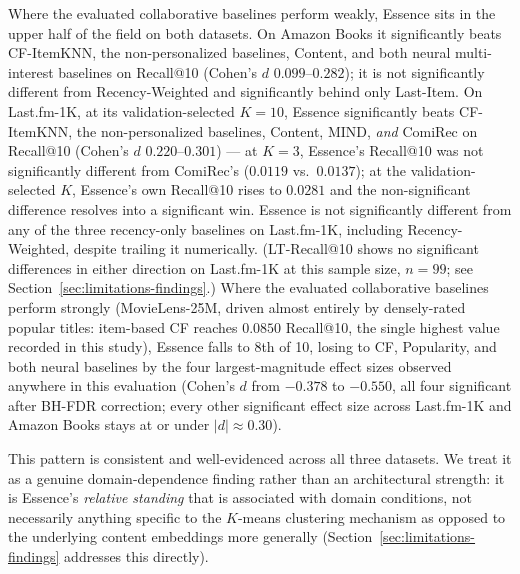 \documentclass[11pt,a4paper]{article}
\begin{document}
Where the evaluated collaborative baselines perform weakly, Essence
sits in the upper half of the field on both datasets. On Amazon Books it
significantly beats CF-ItemKNN, the non-personalized baselines, Content,
and both neural multi-interest baselines on Recall@10 (Cohen's $d$
$0.099$--$0.282$); it is not significantly different from Recency-Weighted
and significantly behind only Last-Item. On
Last.fm-1K, at its validation-selected $K=10$, Essence significantly beats
CF-ItemKNN, the non-personalized baselines, Content, MIND, \emph{and}
ComiRec on
Recall@10 (Cohen's $d$ $0.220$--$0.301$) --- at $K=3$, Essence's Recall@10
was not significantly different from ComiRec's ($0.0119$ vs.\ $0.0137$); at the
validation-selected $K$, Essence's own Recall@10 rises to $0.0281$ and
the non-significant difference resolves into a significant win. Essence is not significantly different from any of the three
recency-only baselines on Last.fm-1K, including Recency-Weighted, despite
trailing it numerically. (LT-Recall@10 shows no significant differences in
either direction on Last.fm-1K at this sample size, $n=99$; see
Section~\ref{sec:limitations-findings}.) Where the evaluated collaborative baselines perform
strongly (MovieLens-25M, driven almost entirely by densely-rated popular
titles: item-based CF reaches $0.0850$ Recall@10, the single highest value
recorded in this study), Essence falls to 8th of 10, losing to CF,
Popularity, and both neural baselines by the four largest-magnitude effect
sizes observed anywhere in this evaluation (Cohen's $d$ from $-0.378$ to
$-0.550$, all four significant after BH-FDR correction; every other
significant effect size across Last.fm-1K and Amazon Books stays at or
under $|d|\approx0.30$).

This pattern is consistent and well-evidenced across all three datasets.
We treat it as a genuine domain-dependence finding rather than an
architectural strength: it is Essence's \emph{relative standing} that
is associated with domain conditions, not necessarily anything specific to the
$K$-means clustering mechanism as opposed to the underlying content
embeddings more generally (Section~\ref{sec:limitations-findings}
addresses this directly).
\end{document}
